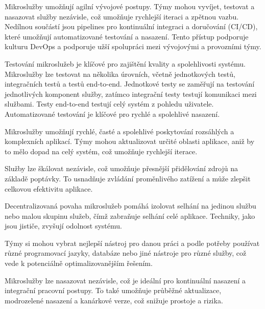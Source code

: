 
Mikroslužby umožňují agilní vývojové postupy. Týmy mohou vyvíjet, testovat a nasazovat služby nezávisle, což umožňuje rychlejší iteraci a zpětnou vazbu. Nedílnou součástí jsou pipelines pro kontinuální integraci a doručování (CI/CD), které umožňují automatizované testování a nasazení. Tento přístup podporuje kulturu DevOps a podporuje užší spolupráci mezi vývojovými a provozními týmy.


Testování mikroslužeb je klíčové pro zajištění kvality a spolehlivosti systému. Mikroslužby lze testovat na několika úrovních, včetně jednotkových testů, integračních testů a testů end-to-end. Jednotkové testy se zaměřují na testování jednotlivých komponent služby, zatímco integrační testy testují komunikaci mezi službami. Testy end-to-end testují celý systém z pohledu uživatele. Automatizované testování je klíčové pro rychlé a spolehlivé nasazení.




Mikroslužby umožňují rychlé, časté a spolehlivé poskytování rozsáhlých a komplexních aplikací. Týmy mohou aktualizovat určité oblasti aplikace, aniž by to mělo dopad na celý systém, což umožňuje rychlejší iterace.


Služby lze škálovat nezávisle, což umožňuje přesnější přidělování zdrojů na základě poptávky. To usnadňuje zvládání proměnlivého zatížení a může zlepšit celkovou efektivitu aplikace.


Decentralizovaná povaha mikroslužeb pomáhá izolovat selhání na jedinou službu nebo malou skupinu služeb, čímž zabraňuje selhání celé aplikace. Techniky, jako jsou jističe, zvyšují odolnost systému.


Týmy si mohou vybrat nejlepší nástroj pro danou práci a podle potřeby používat různé programovací jazyky, databáze nebo jiné nástroje pro různé služby, což vede k potenciálně optimalizovanějším řešením.


Mikroslužby lze nasazovat nezávisle, což je ideální pro kontinuální nasazení a integrační pracovní postupy. To také umožňuje průběžné aktualizace, modrozelené nasazení a kanárkové verze, což snižuje prostoje a rizika.

